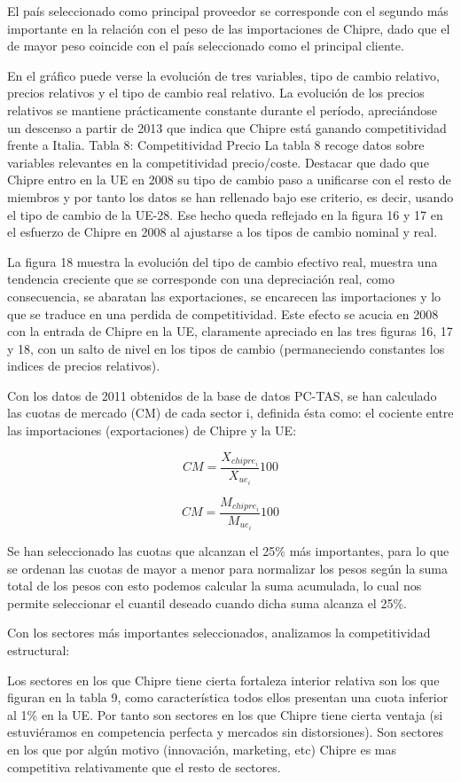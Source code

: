 \documentclass[a4paper,openright,12pt]{book}
\begin{document}
El país seleccionado como principal proveedor se corresponde con el segundo más importante en la relación con el peso de las importaciones de Chipre, dado que el de mayor peso coincide con  el país seleccionado como el principal cliente.

En el gráfico puede verse la evolución de tres variables, tipo de cambio relativo, precios relativos y el tipo de cambio real relativo. La evolución de los precios relativos se mantiene prácticamente constante durante el período, apreciándose un descenso a partir de 2013 que indica que Chipre está ganando competitividad frente a Italia.
Tabla 8: Competitividad Precio
La tabla 8 recoge datos sobre variables relevantes en la competitividad precio/coste. Destacar que dado que Chipre entro en la UE en 2008 su tipo de cambio paso a unificarse con el resto de miembros y por tanto los datos se han rellenado bajo ese criterio, es decir, usando el tipo de cambio de la UE-28.
Ese hecho queda reflejado en la figura 16 y 17 en el esfuerzo de Chipre en 2008 al ajustarse a los tipos de cambio nominal y real.

La figura 18 muestra la evolución del tipo de cambio efectivo real, muestra una tendencia creciente que se corresponde con una depreciación real, como consecuencia, se abaratan las exportaciones, se encarecen las importaciones y lo que se traduce en una perdida de competitividad.
Este efecto se acucia en 2008 con la entrada de Chipre en la UE, claramente apreciado en las tres figuras 16, 17 y 18, con un salto de nivel en los tipos de cambio (permaneciendo constantes los indices de precios relativos).

Con los datos de 2011 obtenidos de la base de datos PC-TAS, se han calculado las cuotas de mercado (CM) de cada sector i, definida ésta como: el cociente entre las importaciones (exportaciones) de Chipre y la UE:

$$CM = \frac{X_{chipre_i}}{X_{ue_i}}100$$

$$CM = \frac{M_{chipre_i}}{M_{ue_i}} 100$$

Se han seleccionado las cuotas que alcanzan el 25\% más importantes, para lo que se ordenan las cuotas de mayor a menor para normalizar los pesos según la suma total de los pesos con esto podemos calcular la suma acumulada, lo cual nos permite seleccionar el cuantil deseado cuando dicha suma alcanza el 25\%.

Con los sectores más importantes seleccionados, analizamos la competitividad estructural:

Los sectores en los que Chipre tiene cierta fortaleza interior relativa son los que figuran en la tabla 9, como característica todos ellos presentan una cuota inferior al 1\% en la UE. Por tanto son sectores en los que Chipre tiene cierta ventaja (si estuviéramos en competencia perfecta y mercados sin distorsiones). Son sectores en los que por algún motivo (innovación, marketing, etc) Chipre es mas competitiva relativamente que el resto de sectores.
\end{document}
